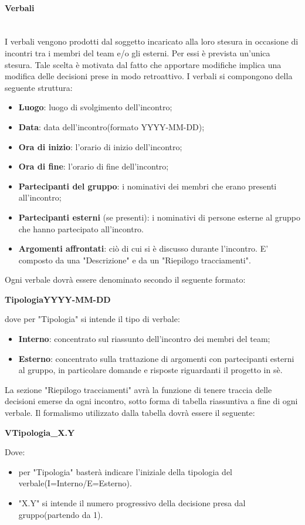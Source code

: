 		\paragraph{Verbali} \mbox{}\\
		I verbali vengono prodotti dal soggetto incaricato alla loro stesura in occasione di incontri tra i membri del team e/o gli esterni. Per essi è prevista un’unica stesura. Tale	scelta è motivata dal fatto che apportare modifiche implica una modifica delle decisioni prese in modo retroattivo.
		I verbali si compongono della seguente struttura:
		\begin{itemize}
			\item \textbf{Luogo}: luogo di svolgimento dell'incontro;
			\item \textbf{Data}: data dell'incontro(formato YYYY-MM-DD);
			\item \textbf{Ora di inizio}: l'orario di inizio dell'incontro;
			\item \textbf{Ora di fine}: l'orario di fine dell'incontro;
			\item \textbf{Partecipanti del gruppo}: i nominativi dei membri che erano presenti all'incontro;
			\item \textbf{Partecipanti esterni} (se presenti): i nominativi di persone esterne al gruppo che hanno partecipato all'incontro.
			\item \textbf{Argomenti affrontati}: ciò di cui si è discusso durante l'incontro. E' composto da una "Descrizione" e da un "Riepilogo tracciamenti".
		\end{itemize}
		Ogni verbale dovrà essere denominato secondo il seguente formato: \newline
		\centerline{\textbf{TipologiaYYYY-MM-DD}} \newline \newline
		dove per "Tipologia" si intende il tipo di verbale:
		\begin{itemize}
			\item \textbf{Interno}: concentrato sul riassunto dell'incontro dei membri del team;
			\item \textbf{Esterno}: concentrato sulla trattazione di argomenti con partecipanti esterni al gruppo, in particolare domande e risposte riguardanti il progetto in sè.
		\end{itemize}
		La sezione "Riepilogo tracciamenti" avrà la funzione di tenere traccia delle decisioni emerse da ogni incontro, sotto forma di tabella riassuntiva a fine di ogni verbale. Il formalismo utilizzato dalla tabella dovrà essere il seguente: \newline
		\centerline{\textbf{VTipologia\_X.Y}} \newline \newline
		Dove:
		\begin{itemize}
			\item per "Tipologia" basterà indicare l'iniziale della tipologia del verbale(I=Interno/E=Esterno).
			\item "X.Y" si intende il numero progressivo della decisione presa dal gruppo(partendo da 1).
		\end{itemize}	
